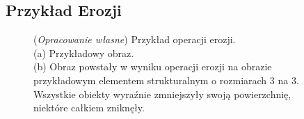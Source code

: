 \documentclass{article}
\begin{document}
    \subsection{Przykład Erozji}
    \begin{figure}[H]
        \centering
        \qquad
        \caption
        {
            (\textit{Opracowanie własne}) Przykład operacji erozji.\\
            (a) Przykładowy obraz.\\
            (b) Obraz powstały w wyniku operacji erozji na obrazie przykładowym elementem strukturalnym o rozmiarach 3 na 3.
            Wszystkie obiekty wyraźnie zmniejszyły swoją powierzchnię, niektóre całkiem zniknęły.
        }
        \label{erozjaex}
    \end{figure}
\end{document}
